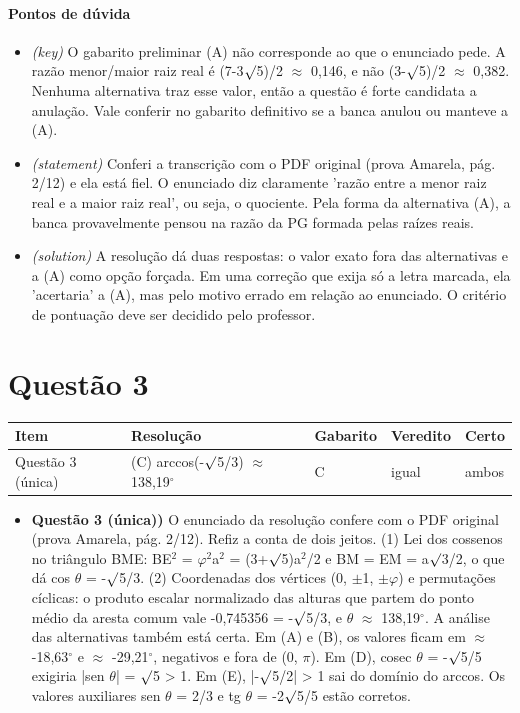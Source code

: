 \documentclass{article}%
\begin{document}
\paragraph{Pontos de dúvida}%
\begin{itemize}%
\item%
\textit{(key)} O gabarito preliminar (A) não corresponde ao que o enunciado pede. A razão menor/maior raiz real é (7-3$\surd$5)/2 $\approx$ 0,146, e não (3-$\surd$5)/2 $\approx$ 0,382. Nenhuma alternativa traz esse valor, então a questão é forte candidata a anulação. Vale conferir no gabarito definitivo se a banca anulou ou manteve a (A).%
\item%
\textit{(statement)} Conferi a transcrição com o PDF original (prova Amarela, pág. 2/12) e ela está fiel. O enunciado diz claramente 'razão entre a menor raiz real e a maior raiz real', ou seja, o quociente. Pela forma da alternativa (A), a banca provavelmente pensou na razão da PG formada pelas raízes reais.%
\item%
\textit{(solution)} A resolução dá duas respostas: o valor exato fora das alternativas e a (A) como opção forçada. Em uma correção que exija só a letra marcada, ela 'acertaria' a (A), mas pelo motivo errado em relação ao enunciado. O critério de pontuação deve ser decidido pelo professor.%
\end{itemize}%
\section*{Questão 3}%
\begin{longtable}{@{}p{} p{} p{} p{} p{}@{}}\toprule Item & Resolução & Gabarito & Veredito & Certo \\ \midrule
Questão 3 (única) & (C) arccos(-$\surd$5/3) $\approx$ 138,19$^\circ$ & C & igual & ambos \\
\bottomrule\end{longtable}%
\begin{itemize}%
\item%
\textbf{Questão 3 (única))} O enunciado da resolução confere com o PDF original (prova Amarela, pág. 2/12). Refiz a conta de dois jeitos. (1) Lei dos cossenos no triângulo BME: BE$^2$ = $\varphi$$^2$a$^2$ = (3+$\surd$5)a$^2$/2 e BM = EM = a$\surd$3/2, o que dá cos $\theta$ = -$\surd$5/3. (2) Coordenadas dos vértices (0, $\pm$1, $\pm$$\varphi$) e permutações cíclicas: o produto escalar normalizado das alturas que partem do ponto médio da aresta comum vale -0,745356 = -$\surd$5/3, e $\theta$ $\approx$ 138,19$^\circ$. A análise das alternativas também está certa. Em (A) e (B), os valores ficam em $\approx$ -18,63$^\circ$ e $\approx$ -29,21$^\circ$, negativos e fora de (0, $\pi$). Em (D), cosec $\theta$ = -$\surd$5/5 exigiria |sen $\theta$| = $\surd$5 > 1. Em (E), |-$\surd$5/2| > 1 sai do domínio do arccos. Os valores auxiliares sen $\theta$ = 2/3 e tg $\theta$ = -2$\surd$5/5 estão corretos.%
\end{itemize}%
\end{document}
